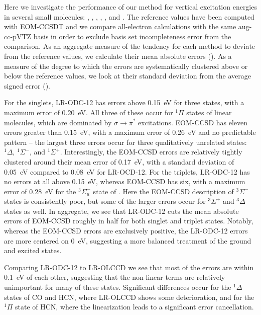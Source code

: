 Here we investigate the performance of our method for vertical excitation
energies in several small molecules: , , , ,
, and .
The reference values have been computed with EOM-CCSDT and we compare
all-electron calculations with the same aug-cc-pVTZ basis in order to exclude
basis set incompleteness error from the comparison.
As an aggregate measure of the tendency for each method to deviate from the
reference values, we calculate their mean absolute errors (\mae).
As a measure of the degree to which the errors are systematically clustered
above or below the reference values, we look at their standard deviation from
the average signed error (\std).

For the singlets, LR-ODC-12 has errors above 0.15~eV for three states, with a
maximum error of 0.20~eV.
All three of these occur for \({}^1\Pi\) states of linear molecules, which are
dominated by \(\sigma\rightarrow\pi^*\) excitations.
EOM-CCSD has eleven errors greater than 0.15~eV, with a maximum error of 0.26~eV
and no predictable pattern -- the largest three errors occur for three
qualitatively unrelated states: \({}^1\Delta\), \({}^1\Sigma^-\), and
\({}^1\Sigma^+\).
Interestingly, the EOM-CCSD errors are relatively tightly clustered around their
mean error of 0.17~eV, with a standard deviation of 0.05~eV compared to 0.08~eV
for LR-OCD-12.
For the triplets, LR-ODC-12 has no errors at all above 0.15~eV, whereas EOM-CCSD
has six, with a maximum error of 0.28~eV for the \({}^3\Sigma_u^-\) state of
.
Here the EOM-CCSD description of \({}^3\Sigma^-\) states is consistently poor,
but some of the larger errors occur for \({}^3\Sigma^+\) and \({}^3\Delta\)
states as well.
In aggregate, we see that LR-ODC-12 cuts the mean absolute errors of EOM-CCSD
roughly in half for both singlet and triplet states.
Notably, whereas the EOM-CCSD errors are exclusively positive, the LR-ODC-12
errors are more centered on 0~eV, suggesting a more balanced treatment of the
ground and excited states.

Comparing LR-ODC-12 to LR-OLCCD we see that most of the errors are within 0.1~eV
of each other, suggesting that the non-linear terms are relatively unimportant
for many of these states.
Significant differences occur for the \({}^1\Delta\) states of CO and HCN, where
LR-OLCCD shows some deterioration, and for the \({}^1\Pi\) state of HCN,
where the linearization leads to a significant error cancellation.


% 

